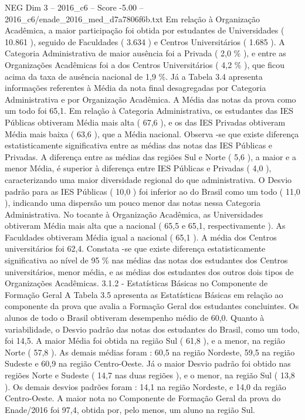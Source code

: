 \begin{textsample}{NEG Dim 3 – 2016\_c6 – Score -5.00 – 2016\_c6/enade\_2016\_med\_d7a7806f6b.txt}
Em relação à Organização Acadêmica, a maior participação foi obtida por estudantes de Universidades ( 10.861 ), seguido de Faculdades ( 3.634 ) e Centros Universitários ( 1.685 ).
A Categoria Administrativa de maior ausência foi a Privada ( 2,0 \% ), e entre as Organizações Acadêmicas foi a dos Centros Universitários ( 4,2 \% ), que ficou acima da taxa de ausência nacional de 1,9 \%.
Já a Tabela 3.4 apresenta informações referentes à Média da nota final desagregadas por Categoria Administrativa e por Organização Acadêmica.
A Média das notas da prova como um todo foi 65,1.
Em relação à Categoria Administrativa, os estudantes das IES Públicas obtiveram Média mais alta ( 67,6 ), e os das IES Privadas obtiveram Média mais baixa ( 63,6 ), que a Média nacional.
Observa -se que existe diferença estatisticamente significativa entre as médias das notas das IES Públicas e Privadas.
A diferença entre as médias das regiões Sul e Norte ( 5,6 ), a maior e a menor Média, é superior à diferença entre IES Públicas e Privadas ( 4,0 ), caracterizando uma maior diversidade regional do que administrativa.
O Desvio padrão para as IES Públicas ( 10,0 ) foi inferior ao do Brasil como um todo ( 11,0 ), indicando uma dispersão um pouco menor das notas nessa Categoria Administrativa.
No tocante à Organização Acadêmica, as Universidades obtiveram Média mais alta que a nacional ( 65,5 e 65,1, respectivamente ).
As Faculdades obtiveram Média igual a nacional ( 65,1 ).
A média dos Centros universitários foi 62,4.
Constata -se que existe diferença estatisticamente significativa ao nível de 95 \% nas médias das notas dos estudantes dos Centros universitários, menor média, e as médias dos estudantes dos outros dois tipos de Organizações Acadêmicas. 3.1.2 - Estatísticas Básicas no Componente de Formação Geral A Tabela 3.5 apresenta as Estatísticas Básicas em relação ao componente da prova que avalia a Formação Geral dos estudantes concluintes.
Os alunos de todo o Brasil obtiveram desempenho médio de 60,0.
Quanto à variabilidade, o Desvio padrão das notas dos estudantes do Brasil, como um todo, foi 14,5.
A maior Média foi obtida na região Sul ( 61,8 ), e a menor, na região Norte ( 57,8 ).
As demais médias foram : 60,5 na região Nordeste, 59,5 na região Sudeste e 60,9 na região Centro-Oeste.
Já o maior Desvio padrão foi obtido nas regiões Norte e Sudeste ( 14,7 nas duas regiões ), e o menor, na região Sul ( 13,8 ).
Os demais desvios padrões foram : 14,1 na região Nordeste, e 14,0 da região Centro-Oeste.
A maior nota no Componente de Formação Geral da prova do Enade/2016 foi 97,4, obtida por, pelo menos, um aluno na região Sul.

\end{textsample}
